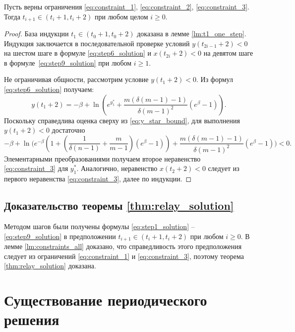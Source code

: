 \begin{lemma}
	\label{lm:constraints_all}
	Пусть верны ограничения \eqref{eq:constraint_1}, \eqref{eq:constraint_2}, \eqref{eq:constraint_3}. Тогда $t_{i + 1} \in (t_i + 1, t_i + 2)$ при любом целом $i \geqslant 0$.
\end{lemma}
\begin{proof}
	
	База индукции $t_1 \in (t_0 + 1, t_0 + 2)$ доказана в лемме \eqref{lm:t1_one_step}. Индукция заключается в последовательной проверке условий $y(t_{2i - 1} + 2) < 0$ на шестом шаге в формуле \eqref{eq:step6_solution} и $x(t_{2i} + 2) < 0$ на девятом шаге в формуле~\eqref{eq:step9_solution} при любом $i \geqslant 1$.
	
	Не ограничивая общности, рассмотрим условие $y(t_1 + 2) < 0$. Из формул \eqref{eq:step6_solution} получаем:
	\[
	y(t_1 + 2) = -\beta + \ln\left(e^{y_1^*} + \frac{m(\delta(m - 1) - 1)}{\delta (m - 1)^2}(e^\beta - 1) \right).
	\]
	Поскольку справедлива оценка сверху из \eqref{eq:y_star_bound}, для выполнения $y(t_1 + 2) < 0$ достаточно
	\small
	\[
	-\beta + \ln\Bigg(e^{-\beta} \left(1 + \left( \dfrac{1}{\delta(n - 1)} + \dfrac{m}{m - 1} \right)(e^{\beta} - 1)\right) + \frac{m(\delta(m - 1) - 1)}{\delta (m - 1)^2} (e^\beta - 1) \Bigg) < 0.
	\]
	\normalsize
	Элементарными преобразованиями получаем второе неравенство \eqref{eq:constraint_3} для $y_1^*$. Аналогично, неравенство $x(t_2 + 2) < 0$ следует из первого неравенства \eqref{eq:constraint_3}, далее по индукции.
\end{proof}

\subsection{Доказательство теоремы \ref{thm:relay_solution}} 
Методом шагов были получены формулы \eqref{eq:step1_solution} -- \eqref{eq:step9_solution} в предположении $t_{i + 1} \in (t_i + 1, t_i + 2)$ при любом $i \geqslant 0$. В лемме \ref{lm:constraints_all} доказано, что справедливость этого предположения следует из ограничений \eqref{eq:constraint_1} и \eqref{eq:constraint_3}, поэтому теорема \ref{thm:relay_solution} доказана.


\section{Существование периодического решения}\label{sec:ch3/sect4}

